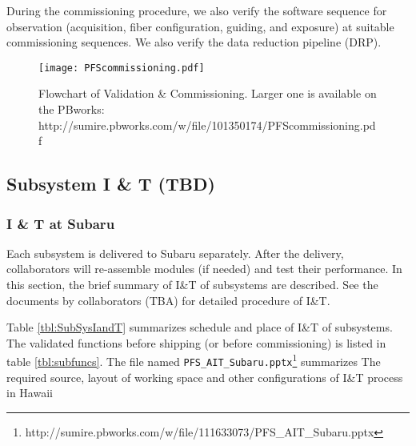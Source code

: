 During the commissioning procedure, we also verify the software sequence for observation (acquisition, fiber configuration, guiding, and exposure) at suitable commissioning sequences.
We also verify the data reduction pipeline (DRP).

\begin{landscape}
\begin{figure}[!ht]
\begin{center}
\vspace*{-10mm}
\hspace*{-5mm}
\texttt{[image: PFScommissioning.pdf]}
\end{center}
\vspace*{-8mm}
\caption{Flowchart of Validation \& Commissioning. Larger one is available on the PBworks: \newline
http://sumire.pbworks.com/w/file/101350174/PFScommissioning.pdf
}
\label{fig:flowchart}
\end{figure}
\end{landscape}

\subsection{Subsystem I \& T (TBD)}
\subsubsection{I \& T at Subaru}
Each subsystem is delivered to Subaru separately.
After the delivery, collaborators will re-assemble modules (if needed) and test their performance.
In this section, the brief summary of I\&T of subsystems are described.
See the documents by collaborators (TBA) for detailed procedure of I\&T.

Table \ref{tbl:SubSysIandT} summarizes schedule and place of I\&T of subsystems.
The validated functions before shipping (or before commissioning) is listed in table \ref{tbl:subfuncs}.
The file named {\tt PFS\_AIT\_Subaru.pptx}\footnote{http://sumire.pbworks.com/w/file/111633073/PFS\_AIT\_Subaru.pptx} summarizes The required source, layout of working space and other configurations of I\&T process in Hawaii

